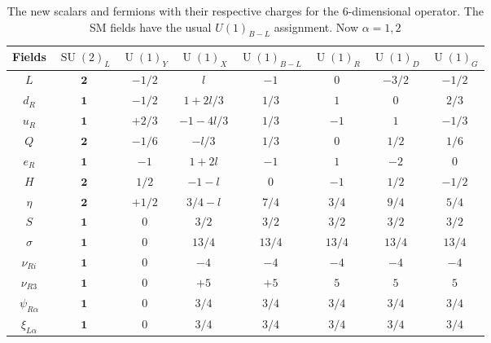 \documentclass[12pt]{article}
\begin{document}
%
\begin{table}
  \centering
  \begin{tabular}{|c|c|c|c|c|c|c|c|}
    \hline  
    Fields     & $\operatorname{SU}(2)_L$ &  $\operatorname{U}(1)_Y $ & $\operatorname{U}(1)_{X}$& $\operatorname{U}(1)_{B-L}$& $\operatorname{U}(1)_R$& $\operatorname{U}(1)_D$& $\operatorname{U}(1)_G$\\ \hline
$L $     & $\boldsymbol{2}$ & $-1/2$ & $l$      &  $-1$&    $0$ &  $-3/2$&  $-1/2$ \\    
$d_R $   & $\boldsymbol{1}$ & $-1/2$ & $1+2l/3$ &  $1/3$&    $1$&  $0$&  $2/3$ \\
$u_R $   & $\boldsymbol{1}$ & $+2/3$ & $-1-4l/3$&  $1/3$&   $-1$&  $1$&  $-1/3$ \\
$Q $     & $\boldsymbol{2}$ & $-1/6$ & $-l/3$   & $1/3$&    $0$&  $1/2$&  $1/6$ \\\hline
$e_R $   & $\boldsymbol{1}$ & $-1$   & $1+2l$   &  $-1$&    $1$ &  $-2$&  $0$ \\
$H $     & $\boldsymbol{2}$ & $1/2$  & $-1-l$   &  $0$&    $-1$ &  $1/2$&  $-1/2$ \\
$\eta$   & $\boldsymbol{2}$ & $+1/2$ & $3/4-l$  & $7/4$& $3/4$ &$9/4$&$5/4$ \\
$S$      & $\boldsymbol{1}$ & $0$    & $3/2$    & $3/2$&  $3/2$ & $3/2$& $3/2$ \\
$\sigma$ & $\boldsymbol{1}$ & $0$    & $13/4$   & $13/4$&  $13/4$ & $13/4$& $13/4$ \\\hline
$\nu_{Ri}$& $\boldsymbol{1}$ & $0$   & $-4$& $-4$&  $-4$ & $-4$& $-4$\\
$\nu_{R3}$& $\boldsymbol{1}$ & $0$   & $+5$& $+5$&  $5$ & $5$& $5$\\
$\psi_{R\alpha}$  & $\boldsymbol{1}$ & $0$& $3/4$ & $3/4$&  $3/4$ & $3/4$& $3/4$ \\\hline
$\xi_{L\alpha}$   & $\boldsymbol{1}$ & $0$ & $3/4$& $3/4$ &  $3/4$ & $3/4$& $3/4$\\\hline
  \end{tabular}
  \caption{The new scalars and fermions with their respective charges for the 6-dimensional operator. The SM fields have the usual $U(1)_{B-L}$ assignment. Now $\alpha=1,2$}
    \label{tab:partcont3}
\end{table}
%
\end{document}
